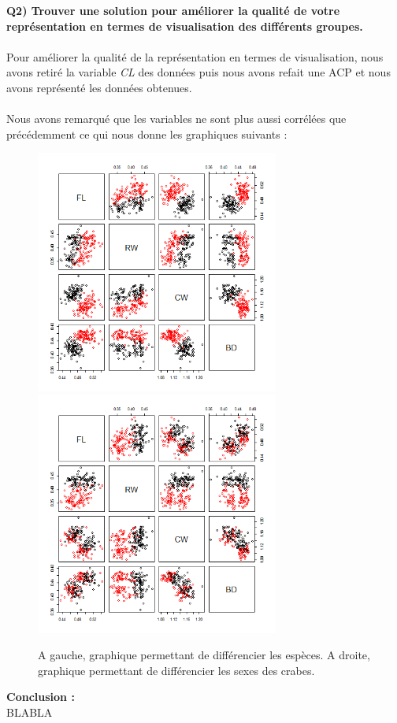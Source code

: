 \documentclass[a4paper, 9pt]{article}
\begin{document}
\newpage
\textbf{Q2) Trouver une solution pour améliorer la qualité de votre représentation en termes de visualisation des différents groupes.}\\
\\Pour am\'eliorer la qualit\'e de la repr\'esentation en termes de visualisation, nous avons retir\'e la variable \textit{CL}
des donn\'ees puis nous avons refait une ACP et nous avons repr\'esent\'e les donn\'ees obtenues.\\
 \\Nous avons remarqué que les variables ne sont plus aussi corr\'el\'ees que pr\'ec\'edemment ce qui nous donne les graphiques suivants :\\

\begin{figure}[h!]
\includegraphics[height = 8cm, width = 8cm]{plots/plot_crabs_sp_2.png}
\includegraphics[height = 8cm, width = 8cm]{plots/plot_crabs_sex_2.png}
\caption{A gauche, graphique permettant de différencier les espèces. A droite, graphique permettant de différencier les sexes des crabes.}
\end{figure} 

\textbf{Conclusion :}\\
BLABLA
\end{document}
